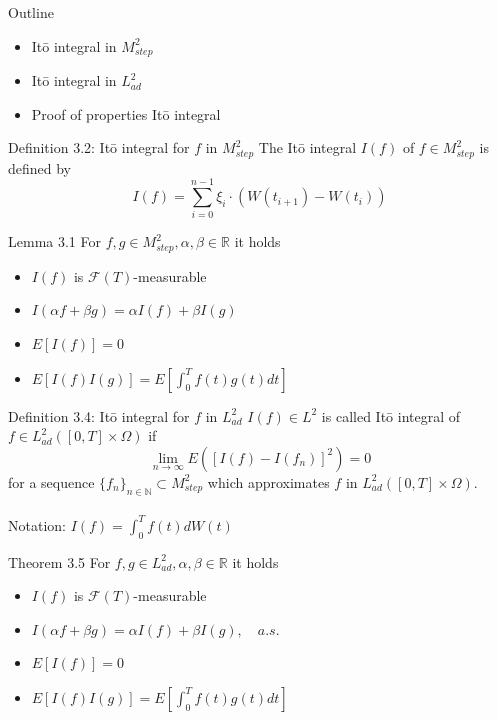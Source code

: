 \documentclass{beamer}
\author{ Ole W. Kaa (olkaa21@student.sdu.dk)}
\begin{document}
\begin{frame}{Outline}
    \begin{itemize}
        \setlength\itemsep{1em}
        \item Itō integral in \(M_{step}^2\)
        \item Itō integral in \(L^2_{ad}\)
        \item Proof of properties  Itō integral
    \end{itemize}
\end{frame}


\begin{frame}{Definition 3.2: Itō integral for \(f\) in \(M_{step}^2\) }
   The Itō integral \(I(f)\) of \(f\in M_{step}^2 \) is defined by
        \[I(f)=\sum_{i=0}^{n-1}\xi_i\cdot (W(t_{i+1})-W(t_i)) \]
\end{frame}

\begin{frame}{Lemma 3.1}
    For \(f,g\in M_{step}^2,\alpha,\beta\in\mathbb{R} \) it holds
    \begin{itemize}
        \setlength\itemsep{1em}
        \item \(I(f)\) is  \(\mathcal{F}(T) \)-measurable
        \item \(I(\alpha f+\beta g)=\alpha I(f)+\beta I(g) \)
        \item \(E [I(f)]=0 \)
        \item \(E[I(f)I(g)]=E[\int_0^T f(t)g(t) dt] \)
    \end{itemize}
\end{frame}

\begin{frame}{Definition 3.4: Itō integral for \(f\) in \(L^2_{ad}\)}
    \(I(f)\in L^2\) is called Itō integral of \(f\in L^2_{ad} ([0,T]\times \Omega )\) if
        \[\lim_{n\rightarrow \infty} E([I(f)-I(f_n)]^2)=0\]
    for a sequence  \(\{f_n\}_{n\in \mathbb{N} }\subset M_{step}^2 \) which approximates \(f\) in \(L_{ad}^2([0,T]\times \Omega )\).\\
    \quad\\
    Notation: \(I(f)=\int_0^T f(t)dW(t) \)

\end{frame}

\begin{frame}{Theorem 3.5}
    For \(f,g\in L_{ad}^2,\alpha,\beta\in\mathbb{R} \) it holds
    \begin{itemize}
        \setlength\itemsep{1em}
        \item \(I(f)\) is  \(\mathcal{F}(T) \)-measurable
        \item \(I(\alpha f+\beta g)=\alpha I(f)+\beta I(g),\quad a.s. \)
        \item \(E [I(f)]=0 \)
        \item \(E[I(f)I(g)]=E[\int_0^T f(t)g(t) dt] \)
    \end{itemize}
\end{frame}
\end{document}
